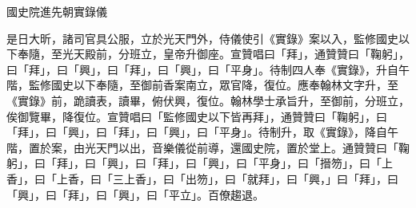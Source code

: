 \begin{pinyinscope}
 國史院進先朝實錄儀



 是日大昕，諸司官具公服，立於光天門外，侍儀使引《實錄》案以入，監修國史以下奉隨，至光天殿前，分班立，皇帝升御座。宣贊唱曰「拜」，通贊贊曰「鞠躬」，曰「拜」，曰「興」，曰「拜」，曰「興」，曰「平身」。待制四人奉《實錄》，升自午階，監修國史以下奉隨，至御前香案南立，眾官降，復位。應奉翰林文字升，至《實錄》前，跪讀表，讀畢，俯伏興，復位。翰林學士承旨升，至御前，分班立，俟御覽畢，降復位。宣贊唱曰「監修國史以下皆再拜」，通贊贊曰「鞠躬」，曰「拜」，曰「興」，曰「拜」，曰「興」，曰「平身」。待制升，取《實錄》，降自午階，置於案，由光天門以出，音樂儀從前導，還國史院，置於堂上。通贊贊曰「鞠躬」，曰「拜」，曰「興」，曰「拜」，曰「興」，曰「平身」，曰「搢笏」，曰「上香」，曰「上香，曰「三上香」，曰「出笏」，曰「就拜」，曰「興，」曰「拜」，曰「興」，曰「拜」，曰「興」，曰「平立」。百僚趨退。



\end{pinyinscope}